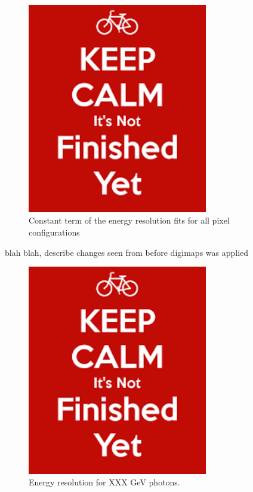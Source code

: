 \begin{figure}
  \centering
  \includegraphics[width=0.7\textwidth,keepaspectratio]{DECALStudies/fig/dummy}
  \caption{Constant term of the energy resolution fits for all pixel configurations}
  \label{fig:constanttermDigi}
\end{figure}


blah blah, describe changes seen from before digimaps was applied

\begin{figure}
  \centering
  \includegraphics[width=0.7\textwidth,keepaspectratio]{DECALStudies/fig/dummy}
  \caption{Energy resolution for XXX GeV photons.}
  \label{fig:resolutionXXXDigi}
\end{figure}

